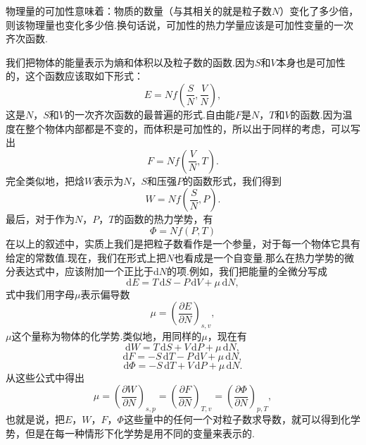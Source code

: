 物理量的可加性意味着：物质的数量（与其相关的就是粒子数$N$）变化了多少倍，则该物理量也变化多少倍.换句话说，可加性的热力学量应该是可加性变量的一次齐次函数.

我们把物体的能量表示为熵和体积以及粒子数的函数.因为$S$和$V$本身也是可加性的，这个函数应该取如下形式：
\begin{equation}
  E=Nf\left(\frac{S}{N},\frac{V}{N}\right),
\end{equation}
这是$N$，$S$和$V$的一次齐次函数的最普遍的形式.自由能$F$是$N$，$T$和$V$的函数.因为温度在整个物体内部都是不变的，而体积是可加性的，所以出于同样的考虑，可以写出
\begin{equation}
  F=Nf\left(\frac{V}{N},T\right).
\end{equation}
完全类似地，把焓$W$表示为$N$，$S$和压强$P$的函数形式，我们得到
\begin{equation}
  W=Nf\left(\frac{S}{N},P\right).
\end{equation}
最后，对于作为$N$，$P$，$T$的函数的热力学势，有
\begin{equation}
  \varPhi=Nf(P,T)
\end{equation}
在以上的叙述中，实质上我们是把粒子数看作是一个参量，对于每一个物体它具有给定的常数值.现在，我们在形式上把$N$也看成是一个自变量.那么在热力学势的微分表达式中，应该附加一个正比于$\mathrm{d}N$的项.例如，我们把能量的全微分写成
\begin{equation}
  \mathrm{d}E=T\,\mathrm{d}S-P\,\mathrm{d}V+\mu\,\mathrm{d}N,
\end{equation}
式中我们用字母$\mu$表示偏导数
\begin{equation}
  \mu=\left(\frac{\partial E}{\partial N}\right)_{s,v},
\end{equation}
$\mu$这个量称为物体的化学势.类似地，用同样的$\mu$，现在有
\begin{equation}
  \mathrm{d}W=T\,\mathrm{d}S+V\,\mathrm{d}P+\mu\,\mathrm{d}N,
\end{equation}
\begin{equation}
  \mathrm{d}F=-S\,\mathrm{d}T-P\,\mathrm{d}V+\mu\,\mathrm{d}N,
\end{equation}
\begin{equation}
  \mathrm{d}\varPhi=-S\,\mathrm{d}T+V\,\mathrm{d}P+\mu\,\mathrm{d}N.
\end{equation}
从这些公式中得出
\begin{equation}
  \mu=\left(\frac{\partial W}{\partial N}\right)_{s,p}
  =\left(\frac{\partial F}{\partial N}\right)_{T,v}
  =\left(\frac{\partial\varPhi}{\partial N}\right)_{p,T},
\end{equation}
也就是说，把$E$，$W$，$F$，$\varPhi$这些量中的任何一个对粒子数求导数，就可以得到化学势，但是在每一种情形下化学势是用不同的变量来表示的.

